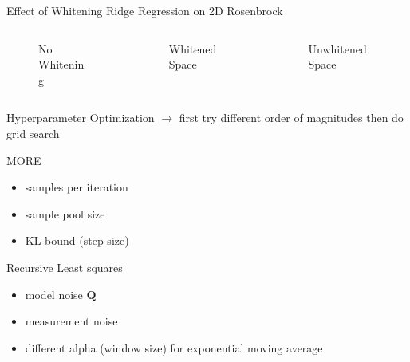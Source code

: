 \documentclass[navbarinfooter, 12pt]{sdqbeamer}
\begin{document}
\begin{frame}{Effect of Whitening}
  Ridge Regression on 2D Rosenbrock
  \begin{columns}[c]
      \begin{column}{5cm}
        \begin{figure}[h!]
          
          \caption{No Whitening}
        \end{figure}
      \end{column}

      \begin{column}{5cm}
        \begin{figure}[h!]
          
          \caption{Whitened Space}
        \end{figure}
      \end{column}

      \begin{column}{5cm}
        \begin{figure}[h!]
          
          \caption{Unwhitened Space}
        \end{figure}
      \end{column}
    \end{columns}
\end{frame}

\begin{frame}{Hyperparameter Optimization}
  $\rightarrow$ first try different order of magnitudes then do grid search
  \begin{block}{MORE}
    \begin{itemize}
    \item samples per iteration
    \item sample pool size
    \item KL-bound (step size)
    \end{itemize}
  \end{block}
  \begin{block}{Recursive Least squares}
    \begin{itemize}
    \item model noise $\textbf{Q}$
    \item measurement noise 
    \item different alpha (window size) for exponential moving average
    \end{itemize}
  \end{block}
\end{frame}
\end{document}
